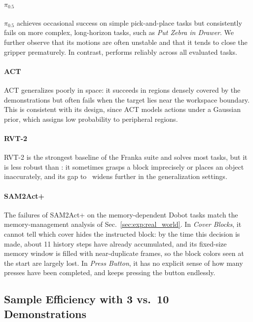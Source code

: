 \paragraph{$\pi_{0.5}$~\cite{intelligence2025pi_}}
$\pi_{0.5}$ achieves occasional success on simple pick-and-place tasks but
consistently fails on more complex, long-horizon tasks, such as
\emph{Put Zebra in Drawer}.
We further observe that its motions are often unstable and that it tends to
close the gripper prematurely.
In contrast, \method performs reliably across all evaluated
tasks.

\paragraph{ACT~\cite{zhao2023learning}}
ACT generalizes poorly in space: it succeeds in regions densely covered
by the demonstrations but often fails when the target lies near the
workspace boundary.
This is consistent with its design, since ACT models actions under a
Gaussian prior, which assigns low probability to peripheral regions.

\paragraph{RVT-2~\cite{goyal2024rvt}}
RVT-2 is the strongest baseline of the Franka suite and solves most
tasks, but it is less robust than \method: it sometimes grasps a block
imprecisely or places an object inaccurately, and its gap to \method\
widens further in the generalization settings.

\paragraph{SAM2Act+~\cite{fang2025sam2act}}
The failures of SAM2Act+ on the memory-dependent Dobot tasks match the
memory-management analysis of Sec.~\ref{sec:exp:real_world}.
In \emph{Cover Blocks}, it cannot tell which cover hides the instructed
block: by the time this decision is made, about 11 history steps have
already accumulated, and its fixed-size memory window is filled with
near-duplicate frames, so the block colors seen at the start are
largely lost.
In \emph{Press Button}, it has no explicit sense of how many presses
have been completed, and keeps pressing the button endlessly.

\subsection{Sample Efficiency with 3 vs.\ 10 Demonstrations}
\label{app:real_episode_analysis}

